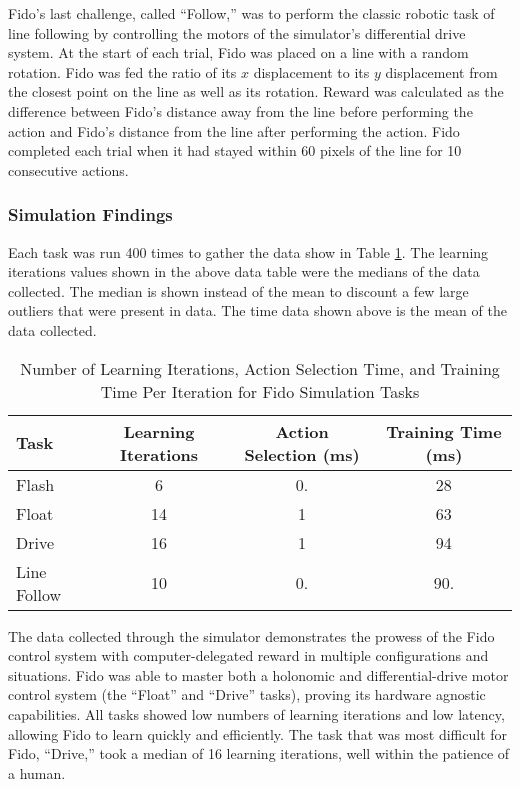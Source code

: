 Fido's last challenge, called ``Follow,'' was to perform the classic robotic task of line following by controlling the motors of the simulator's differential drive system.
At the start of each trial, Fido was placed on  a line with a random rotation.
Fido was fed the ratio of its $x$ displacement to its $y$ displacement from the closest point on the line as well as its rotation.
Reward was calculated as the difference between Fido's distance away from the line before performing the action and Fido's distance from the line after performing the action.
Fido completed each trial when it had stayed within 60 pixels of the line for 10 consecutive actions.

\subsubsection{Simulation Findings}

Each task was run 400 times to gather the data show in Table \ref{tab:data}.
The learning iterations values shown in the above data table were the medians of the data collected.
The median is shown instead of the mean to discount a few large outliers that were present in data.
The time data shown above is the mean of the data collected.

\begin{table}[ht]
	\centering
	\begin{tabular}{@{}lccc@{}}
		\toprule
		Task        & Learning Iterations & Action Selection (ms) & Training Time (ms) \\ \midrule
		Flash       & 6                   & 0.                 & 28               \\
		Float       & 14                  & 1                  & 63              \\
		Drive       & 16                  & 1                  & 94             \\
		Line Follow & 10                  & 0.                  & 90.
             \\ \bottomrule
	\end{tabular}
	\caption{Number of Learning Iterations, Action Selection Time, and Training Time Per Iteration for Fido Simulation Tasks}
	\label{tab:data}
\end{table}

The data collected through the simulator demonstrates the prowess of the Fido control system with computer-delegated reward in multiple configurations and situations.
 Fido was able to master both a holonomic and differential-drive motor control system (the ``Float'' and ``Drive'' tasks), proving its hardware agnostic capabilities.
All tasks showed low numbers of learning iterations and low latency, allowing Fido to learn quickly and efficiently.
The task that was most difficult for Fido, ``Drive,'' took a median of 16 learning iterations, well within the patience of a human.

